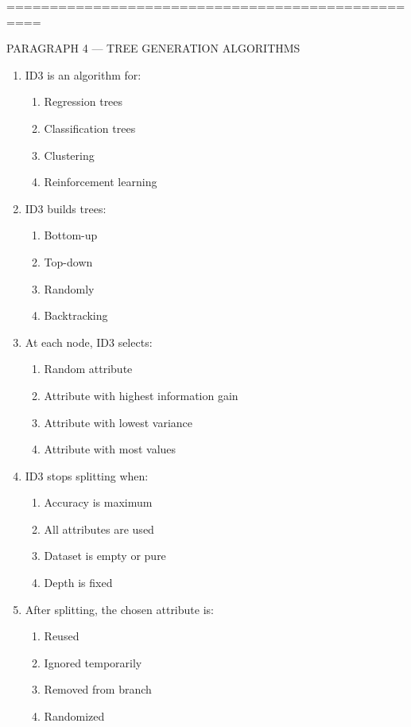 \documentclass[3pt]{article}
\begin{document}
\vspace{0.3em}

	==================================================
	
	PARAGRAPH 4 — TREE GENERATION ALGORITHMS
	
	\begin{enumerate}
		\item ID3 is an algorithm for:
		\begin{enumerate}
			\item Regression trees
			\item Classification trees
			\item Clustering
			\item Reinforcement learning
		\end{enumerate}
		
		\item ID3 builds trees:
		\begin{enumerate}
			\item Bottom-up
			\item Top-down
			\item Randomly
			\item Backtracking
		\end{enumerate}
		
		\item At each node, ID3 selects:
		\begin{enumerate}
			\item Random attribute
			\item Attribute with highest information gain
			\item Attribute with lowest variance
			\item Attribute with most values
		\end{enumerate}
		
		\item ID3 stops splitting when:
		\begin{enumerate}
			\item Accuracy is maximum
			\item All attributes are used
			\item Dataset is empty or pure
			\item Depth is fixed
		\end{enumerate}
		
		\item After splitting, the chosen attribute is:
		\begin{enumerate}
			\item Reused
			\item Ignored temporarily
			\item Removed from branch
			\item Randomized
		\end{enumerate}
		

\end{enumerate}
\end{document}
